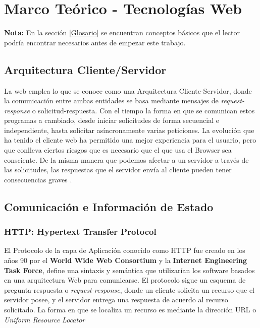 \chapter{Marco Teórico - Tecnologías Web}
\label{chap2:MT}

\textbf{Nota:} En la sección \ref{Glosario} se encuentran conceptos básicos que el lector podría encontrar necesarios antes de empezar este trabajo.

\section{Arquitectura Cliente/Servidor}
    \label{chap2:ArqCS}
    La web emplea lo que se conoce como una Arquitectura Cliente-Servidor, donde la comunicación entre ambas entidades se basa mediante mensajes de \textit{request-response} o solicitud-respuesta. Con el tiempo la forma en que se comunican estos programas a cambiado, desde iniciar solicitudes de forma secuencial e independiente, hasta solicitar asíncronamente varias peticiones. La evolución que ha tenido el cliente web ha permitido una mejor experiencia para el usuario, pero que conlleva ciertos riesgos que es necesario que el que usa el Browser sea consciente. De la misma manera que podemos afectar a un servidor a través de las solicitudes, las respuestas que el servidor envía al cliente pueden tener consecuencias graves \cite{alcorn2014browser}.


\section{Comunicación e Información de Estado}

    \subsection{HTTP: Hypertext Transfer Protocol}
    \label{chap2:HTTP}
    El Protocolo de la capa de Aplicación conocido como HTTP fue creado en los años 90 por el \textbf{World Wide Web Consortium} \cite{w3c} y la \textbf{Internet Engineering Task Force}, define una sintaxis y semántica que utilizarían los software basados en una arquitectura Web para comunicarse. El protocolo sigue un esquema de pregunta-respuesta o \textit{request-response}, donde un cliente solicita un recurso que el servidor posee, y el servidor entrega una respuesta de acuerdo al recurso solicitado. La forma en que se localiza un recurso es mediante la dirección URL o \textit{Uniform Resource Locator}

